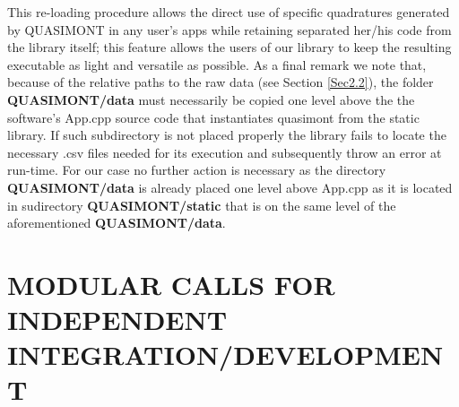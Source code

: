 \documentclass[a4paper, twosided]{book}
\begin{document}
\noindent
This re-loading procedure allows the direct use of specific quadratures generated by QUASIMONT in any user's apps while retaining separated her/his code from the library itself; this feature allows the users of our library to keep the resulting executable as light and versatile as possible. As a final remark we note that, because of the relative paths to the raw data (see Section \ref{Sec2.2}), the folder \colorbox{poliGrayBlue}{\textbf{QUASIMONT/data}} must necessarily be copied one level above the the software's \colorbox{poliGrayBlue}{App.cpp} source code that instantiates \colorbox{poliGrayBlue}{quasimont} from the static library. If such subdirectory is not placed properly the library fails to locate the necessary \colorbox{poliGrayBlue}{.csv} files needed for its execution and subsequently throw an error at run-time. For our case no further action is necessary as the directory \colorbox{poliGrayBlue}{\textbf{QUASIMONT/data}} is already placed one level above \colorbox{poliGrayBlue}{App.cpp} as it is located in sudirectory \colorbox{poliGrayBlue}{\textbf{QUASIMONT/static}} that is on the same level of the aforementioned \colorbox{poliGrayBlue}{\textbf{QUASIMONT/data}}.

\newpage
\section[Modular calls for independent integration/development]{\changefont MODULAR CALLS FOR INDEPENDENT INTEGRATION/DEVELOPMENT}\label{Sec3.4}
\end{document}
